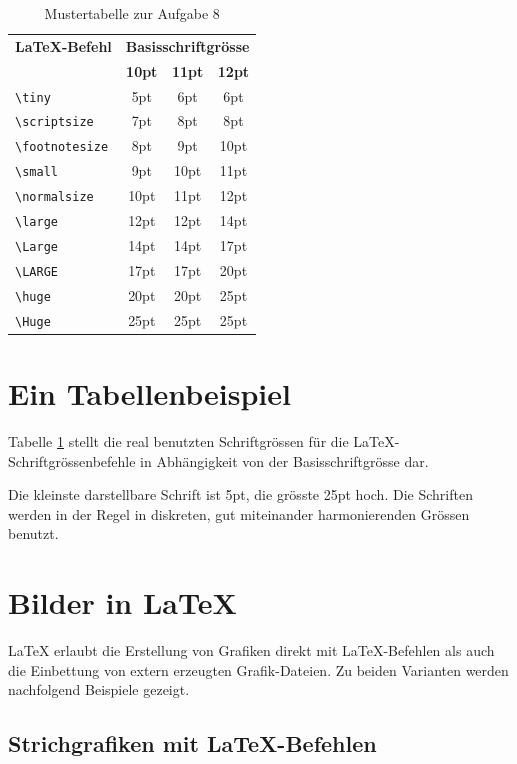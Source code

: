 \documentclass[11pt, a4paper]{article}
\newcommand{\ltx}{\LaTeX}
\begin{document}
\begin{table}[t]
\caption{Mustertabelle zur Aufgabe 8  \label{tab:Schriftgroessen}}
\centering
\begin{tabular}{lccc}
\toprule
\textbf{\ltx-Befehl} & \multicolumn{3}{c}{\textbf{Basisschriftgrösse}}\\
\cline{2-4} & \textbf{10pt} & \textbf{11pt} & \textbf{12pt}\\
\midrule
\midrule
\verb+\tiny+			& 5pt & 6pt 	& 6pt\\
\verb+\scriptsize+		& 7pt & 8pt		& 8pt\\
\verb+\footnotesize+	& 8pt & 9pt		& 10pt\\
\verb+\small+			& 9pt & 10pt	& 11pt\\
\midrule
\midrule
\verb+\normalsize+		& 10pt	& 11pt	& 12pt\\
\midrule
\midrule
\verb+\large+			& 12pt	& 12pt	& 14pt\\
\verb+\Large+			& 14pt	& 14pt	& 17pt\\
\verb+\LARGE+			& 17pt	& 17pt	& 20pt\\
\verb+\huge+			& 20pt	& 20pt	& 25pt\\
\verb+\Huge+			& 25pt	& 25pt	& 25pt\\
\bottomrule
\end{tabular}
\end{table}%

\section{Ein Tabellenbeispiel}
Tabelle \ref{tab:Schriftgroessen} stellt die real benutzten Schriftgrössen für die \ltx-Schriftgrössenbefehle in Abhängigkeit von der Basisschriftgrösse dar.\par
Die kleinste darstellbare Schrift ist 5pt, die grösste 25pt hoch. Die Schriften werden in der Regel in diskreten, gut miteinander harmonierenden Grössen benutzt.

\section{Bilder in \ltx}
\ltx{} erlaubt die Erstellung von Grafiken direkt mit \ltx-Befehlen als auch die Einbettung von extern erzeugten Grafik-Dateien. Zu beiden Varianten werden nachfolgend Beispiele gezeigt.




\subsection{Strichgrafiken mit \ltx-Befehlen}
\end{document}
